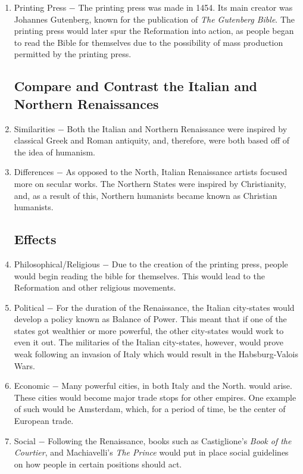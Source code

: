 \documentclass[12pt]{article}
\begin{document}
\begin{enumerate}
\item Printing Press $-$ The printing press was made in 1454. Its main creator was Johannes Gutenberg, known for the publication of \textit{The Gutenberg Bible}. The printing press would later spur the Reformation into action, as people began to read the Bible for themselves due to the possibility of mass production permitted by the printing press.

\subsection{Compare and Contrast the Italian and Northern Renaissances}

\item Similarities $-$ Both the Italian and Northern Renaissance were inspired by classical Greek and Roman antiquity, and, therefore, were both based off of the idea of humanism.

\item Differences $-$ As opposed to the North, Italian Renaissance artists focused more on secular works. The Northern States were inspired by Christianity, and, as a result of this, Northern humanists became known as Christian humanists.

\subsection{Effects}

\item Philosophical/Religious $-$ Due to the creation of the printing press, people would begin reading the bible for themselves. This would lead to the Reformation and other religious movements.

\item Political $-$ For the duration of the Renaissance, the Italian city-states would develop a policy known as Balance of Power. This meant that if one of the states got wealthier or more powerful, the other city-states would work to even it out. The militaries of the Italian city-states, however, would prove weak following an invasion of Italy which would result in the Habsburg-Valois Wars.

\item Economic $-$ Many powerful cities, in both Italy and the North. would arise. These cities would become major trade stops for other empires. One example of such would be Amsterdam, which, for a period of time, be the center of European trade.

\item Social $-$ Following the Renaissance, books such as Castiglione's \textit{Book of the Courtier}, and Machiavelli's \textit{The Prince} would put in place social guidelines on how people in certain positions should act.


\end{enumerate}
\end{document}
